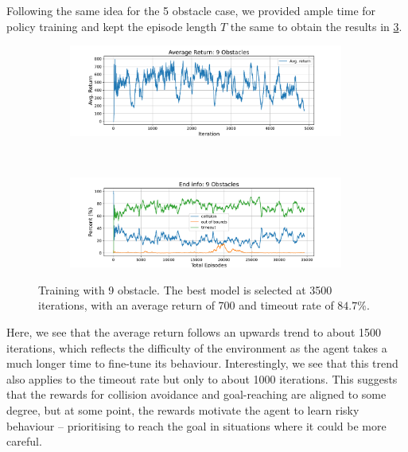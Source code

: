 Following the same idea for the 5 obstacle case, we provided ample time for policy training and kept the episode length $T$ the same to obtain the results in  \cref{fig:7_train_nav_9_obst}.
\begin{figure}[htb]
    \centering
    \begin{subfigure}[b]{\textwidth}
        \centering
        \captionsetup{justification=centering}
        \includegraphics[width=0.99\textwidth]{figures/7_/3DCarModel_BodyObs_NavSetup_9_NewObs_EnvSpace10_last3150_v1_reward.pdf}
        \label{fig:9_obst_nav_rew}
    \end{subfigure} \\
    \begin{subfigure}[b]{\textwidth}
        \centering
        \captionsetup{justification=centering}
        \includegraphics[width=0.99\textwidth]{figures/7_/3DCarModel_BodyObs_NavSetup_9_NewObs_EnvSpace10_last3150_v1_end_info.pdf}
        \label{fig:9_obst_nav_end}
    \end{subfigure} 
    \caption{Training with 9 obstacle. The best model is selected at 3500 iterations, with an average return of 700 and timeout rate of $84.7\%$. }
    \label{fig:7_train_nav_9_obst}
\end{figure}
Here, we see that the average return follows an upwards trend to about 1500 iterations, which reflects the difficulty of the environment as the agent takes a much longer time to fine-tune its behaviour. Interestingly, we see that this trend also applies to the timeout rate but only to about 1000 iterations. This suggests that the rewards for collision avoidance and goal-reaching are aligned to some degree, but at some point, the rewards motivate the agent to learn risky behaviour -- prioritising to reach the goal in situations where it could be more careful.

